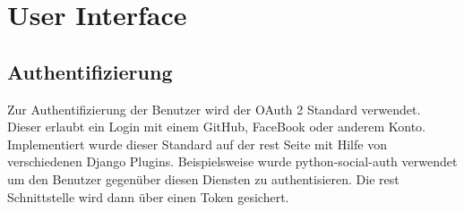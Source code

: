 

\section{User Interface}
\subsection{Authentifizierung}
Zur Authentifizierung der Benutzer wird der OAuth 2 Standard verwendet. Dieser erlaubt ein Login mit einem GitHub, FaceBook oder anderem Konto. Implementiert wurde dieser Standard auf der \acs{rest} Seite mit Hilfe von verschiedenen Django Plugins. 
Beispielsweise wurde python-social-auth verwendet um den Benutzer gegenüber diesen Diensten zu authentisieren. Die \acs{rest} Schnittstelle wird dann über einen Token gesichert.

